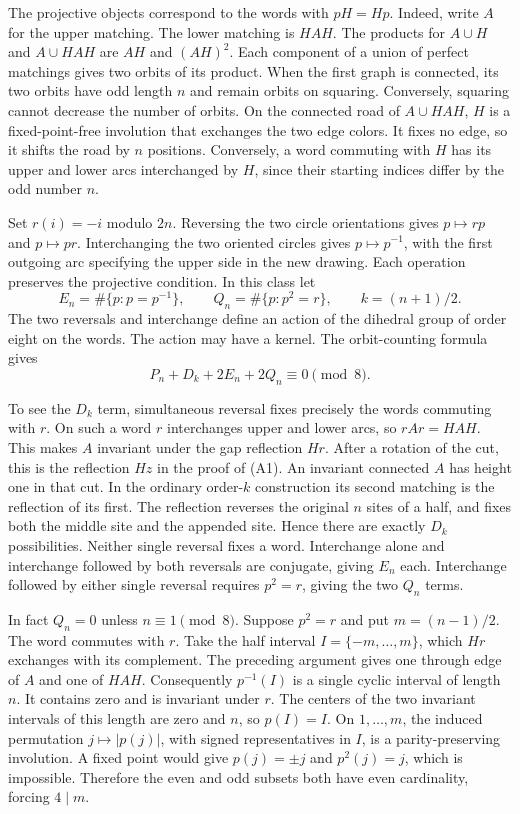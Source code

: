 The projective objects correspond to the words with \(pH=Hp\).
Indeed, write \(A\) for the upper matching. The lower matching is
\(HAH\). The products for \(A\cup H\) and \(A\cup HAH\) are \(AH\)
and \((AH)^2\). Each component of a union of perfect matchings
gives two orbits of its product. When the first graph is connected,
its two orbits have odd length \(n\) and remain orbits on squaring.
Conversely, squaring cannot decrease the number of orbits.
On the connected road of \(A\cup HAH\), \(H\) is a fixed-point-free
involution that exchanges the two edge colors. It fixes no edge,
so it shifts the road by \(n\) positions. Conversely, a word
commuting with \(H\) has its upper and lower arcs interchanged by
\(H\), since their starting indices differ by the odd number \(n\).

Set \(r(i)=-i\) modulo \(2n\). Reversing the two circle orientations
gives \(p\mapsto rp\) and \(p\mapsto pr\). Interchanging the two
oriented circles gives \(p\mapsto p^{-1}\), with the first outgoing
arc specifying the upper side in the new drawing. Each operation
preserves the projective condition. In this class let
\[
 E_n=\#\{p:p=p^{-1}\},\qquad Q_n=\#\{p:p^2=r\},\qquad
 k=(n+1)/2 .
\]
The two reversals and interchange define an action of the dihedral
group of order eight on the words. The action may have a kernel.
The orbit-counting formula gives
\[
 P_n+D_k+2E_n+2Q_n\equiv0\pmod 8.                      \tag{A2}
\]

To see the \(D_k\) term, simultaneous reversal fixes precisely the
words commuting with \(r\). On such a word \(r\) interchanges
upper and lower arcs, so \(rAr=HAH\). This makes \(A\) invariant
under the gap reflection \(Hr\). After a rotation of the cut,
this is the reflection \(Hz\) in the proof of (A1). An invariant
connected \(A\) has height one in that cut. In the ordinary
order-\(k\) construction its second matching is the reflection of
its first. The reflection reverses the original \(n\) sites of a half,
and fixes both the middle site and the appended site. Hence there are
exactly \(D_k\) possibilities. Neither single reversal fixes a word.
Interchange alone and interchange followed by both reversals are
conjugate, giving \(E_n\) each. Interchange followed by either single
reversal requires \(p^2=r\), giving the two \(Q_n\) terms.

In fact \(Q_n=0\) unless \(n\equiv1\pmod8\). Suppose \(p^2=r\) and
put \(m=(n-1)/2\). The word commutes with \(r\). Take the half
interval \(I=\{-m,\ldots,m\}\), which \(Hr\) exchanges with its
complement. The preceding argument gives one through edge of \(A\)
and one of \(HAH\). Consequently \(p^{-1}(I)\) is a single cyclic
interval of length \(n\). It contains zero and is invariant under
\(r\). The centers of the two invariant intervals of this length
are zero and \(n\), so \(p(I)=I\). On \(1,\ldots,m\), the induced
permutation \(j\mapsto |p(j)|\), with signed representatives in
\(I\), is a parity-preserving involution. A fixed point would give
\(p(j)=\pm j\) and \(p^2(j)=j\), which is impossible. Therefore the
even and odd subsets both have even cardinality, forcing \(4\mid m\).

